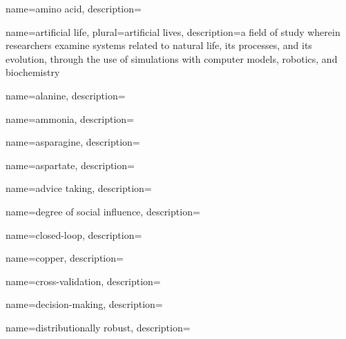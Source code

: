 


	{
		name={amino acid},
		description={}
	}


	{
		name={artificial life},
		plural={artificial lives},
		description={a field of study wherein researchers examine systems related to natural life, its processes, and its evolution, through the use of simulations with computer models, robotics, and biochemistry}
	}
	
	{
		name={alanine},
		description={}
	}	
	
	{
		name={ammonia},
		description={}
	}	
	
	{
		name={asparagine},
		description={}
	}

	{
		name={aspartate},
		description={}
	}		

	{
		name={advice taking},
		description={}
	}	


	{
		name={degree of social influence},
		description={}
	}


	{
		name={closed-loop},
		description={}
	}	

	{
		name={copper},
		description={}
	}

	{
		name={cross-validation},
		description={}
	}		
	

	{
		name={decision-making},
		description={}
	}

	{
		name={distributionally robust},
		description={}
	}
	
